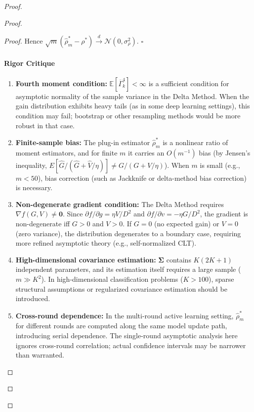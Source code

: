\documentclass[12pt,a4paper]{article}
\newcommand{\E}{\mathbb{E}}
\newenvironment{critique}{\paragraph{Rigor Critique}\quad}{\par}
\begin{document}
\begin{proof}
\begin{proof}
\begin{proof}
Hence $\sqrt{m}(\hat\rho^*_m - \rho^*) \xrightarrow{d} \mathcal{N}(0,\sigma^2_\rho)$. \hfill$\square$

\begin{critique}
\begin{enumerate}
    \item \textbf{Fourth moment condition:} $\E[\overline{\Gamma}_k^4]<\infty$ is a sufficient condition for asymptotic normality of the sample variance in the Delta Method. When the gain distribution exhibits heavy tails (as in some deep learning settings), this condition may fail; bootstrap or other resampling methods would be more robust in that case.
    \item \textbf{Finite-sample bias:} The plug-in estimator $\hat\rho^*_m$ is a nonlinear ratio of moment estimators, and for finite $m$ it carries an $O(m^{-1})$ bias (by Jensen's inequality, $E[\hat G/(\hat G+\hat V/\eta)] \neq G/(G+V/\eta)$). When $m$ is small (e.g., $m<50$), bias correction (such as Jackknife or delta-method bias correction) is necessary.
    \item \textbf{Non-degenerate gradient condition:} The Delta Method requires $\nabla f(G,V) \neq \bm 0$. Since $\partial f/\partial g = \eta V/D^2$ and $\partial f/\partial v = -\eta G/D^2$, the gradient is non-degenerate iff $G>0$ and $V>0$. If $G=0$ (no expected gain) or $V=0$ (zero variance), the distribution degenerates to a boundary case, requiring more refined asymptotic theory (e.g., self-normalized CLT).
    \item \textbf{High-dimensional covariance estimation:} $\bm\Sigma$ contains $K(2K+1)$ independent parameters, and its estimation itself requires a large sample ($m\gg K^2$). In high-dimensional classification problems ($K>100$), sparse structural assumptions or regularized covariance estimation should be introduced.
    \item \textbf{Cross-round dependence:} In the multi-round active learning setting, $\hat\rho^*_m$ for different rounds are computed along the same model update path, introducing serial dependence. The single-round asymptotic analysis here ignores cross-round correlation; actual confidence intervals may be narrower than warranted.
\end{enumerate}
\end{critique}


\end{proof}
\end{proof}
\end{proof}
\end{document}
